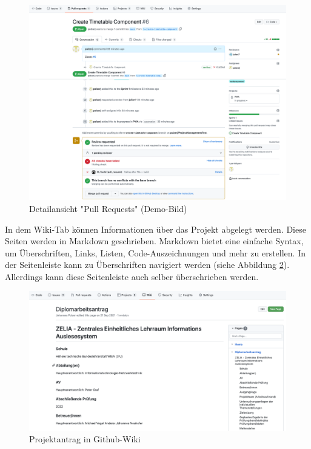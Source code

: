 \begin{figure}[H]
    \centering
    \includegraphics[width=\textwidth]{media/ProjectManagement/PullInfo.png}
    \caption{Detailansicht "Pull Requests" (Demo-Bild)}
    \label{fig:pullInfo}
\end{figure}


In dem Wiki-Tab können Informationen über das Projekt abgelegt werden. Diese Seiten werden in Markdown geschrieben. Markdown bietet eine einfache Syntax, um Überschriften, Links, Listen, Code-Auszeichnungen und mehr zu erstellen. In der Seitenleiste kann zu Überschriften navigiert werden (siehe Abbildung \ref{fig:Projektantrag}). Allerdings kann diese Seitenleiste auch selber überschrieben werden.

\begin{figure}[H]
    \centering
    \includegraphics[width=\textwidth]{media/ProjectManagement/Wiki.png}
    \caption{Projektantrag in Github-Wiki}
    \label{fig:Projektantrag}
\end{figure}

